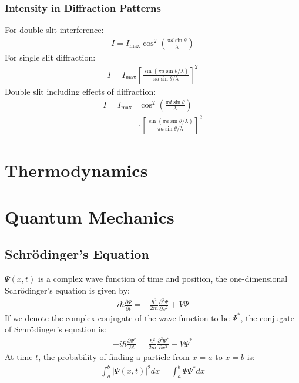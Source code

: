 \documentclass[11pt]{article}
\newcommand{\cc}[1]{
  \ensuremath{#1^{\ast}}}               %
\newcommand{\pd}[2]{
  \ensuremath{
    \frac{\partial #1}{\partial #2} }} %
\begin{document}
\begin{multicols*}{3}
\subsubsection{Intensity in Diffraction Patterns}
For double slit interference:
\begin{align*}
I = I_{\text{max}} \cos^2\left(\frac{\pi d \sin{\theta}}{\lambda} \right)
\end{align*}
For single slit diffraction:
\begin{align*}
I = I_{\text{max}} \left [\frac{\sin(\pi a \sin \theta / \lambda)}{\pi a \sin \theta / \lambda} \right]^2
\end{align*}
Double slit including effects of diffraction:
\begin{align*}
I = I_{\text{max}} &\cos^2\left(\frac{\pi d \sin{\theta}}{\lambda} \right) \\
&\cdot  \left [\frac{\sin(\pi a \sin \theta / \lambda)}{\pi a \sin \theta / \lambda} \right]^2
\end{align*}
	
\section{Thermodynamics}

\section{Quantum Mechanics}
\subsection{Schr\"{o}dinger's Equation}
$\Psi(x, t)$ is a complex wave function of time and position, the one-dimensional Schr\"{o}dinger's equation is given by:
\begin{align*}
i \hbar \pd{\Psi}{t} = - \frac{\hbar^2}{2m} \pd{^2 \Psi}{x^2} + V\Psi
\end{align*}
If we denote the complex conjugate of the wave function to be $\cc{\Psi}$, the conjugate of Schr\"{o}dinger's equation is:
\begin{align*}
-i \hbar \pd{\cc{\Psi}}{t} = \frac{\hbar^2}{2m} \pd{^2 \cc{\Psi}}{x^2} - V\cc{\Psi}
\end{align*}
At time $t$, the probability of finding a particle from $x=a$ to $x=b$ is:
\begin{align*}
\int_{a}^{b} |\Psi(x, t)|^2 dx = \int_{a}^{b}\Psi\cc{\Psi}dx
\end{align*}

\end{multicols*}
\end{document}
